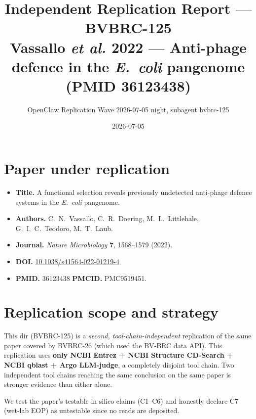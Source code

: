 \documentclass[11pt]{article}
\title{Independent Replication Report --- BVBRC-125\\
       \large Vassallo \emph{et al.} 2022 --- Anti-phage defence in the \emph{E.\ coli} pangenome\\
       (PMID 36123438)}
\author{OpenClaw Replication Wave 2026-07-05 night, subagent bvbrc-125}
\date{2026-07-05}
\begin{document}
\maketitle

\section*{Paper under replication}
\begin{itemize}
  \item \textbf{Title.} A functional selection reveals previously undetected anti-phage defence systems in the \emph{E.\ coli} pangenome.
  \item \textbf{Authors.} C.\ N.\ Vassallo, C.\ R.\ Doering, M.\ L.\ Littlehale, G.\ I.\ C.\ Teodoro, M.\ T.\ Laub.
  \item \textbf{Journal.} \emph{Nature Microbiology} \textbf{7}, 1568--1579 (2022).
  \item \textbf{DOI.} \href{https://doi.org/10.1038/s41564-022-01219-4}{10.1038/s41564-022-01219-4}
  \item \textbf{PMID.} 36123438 \quad\textbf{PMCID.} PMC9519451.
\end{itemize}

\section{Replication scope and strategy}
This dir (BVBRC-125) is a \emph{second, tool-chain-independent} replication of the same paper covered by BVBRC-26 (which used the BV-BRC data API). This replication uses \textbf{only NCBI Entrez + NCBI Structure CD-Search + NCBI qblast + Argo LLM-judge}, a completely disjoint tool chain. Two independent tool chains reaching the same conclusion on the same paper is stronger evidence than either alone.

We test the paper's testable in silico claims (C1--C6) and honestly declare C7 (wet-lab EOP) as untestable since no reads are deposited.
\end{document}
